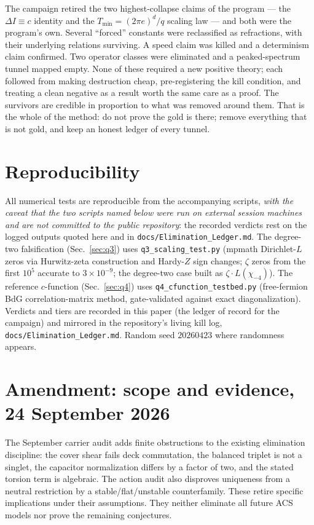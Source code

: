 \documentclass[11pt]{article}
\newcommand{\DI}{\Delta I}
\newcommand{\Tmin}{T_{\min}}
\begin{document}
The campaign retired the two highest-collapse claims of the program --- the
$\DI\equiv c$ identity and the $\Tmin=(2\pi e)^d/q$ scaling law --- and both were the
program's own. Several ``forced'' constants were reclassified as refractions, with their
underlying relations surviving. A speed claim was killed and a determinism claim
confirmed. Two operator classes were eliminated and a peaked-spectrum tunnel mapped
empty. None of these required a new positive theory; each followed from making
destruction cheap, pre-registering the kill condition, and treating a clean negative as a
result worth the same care as a proof. The survivors are credible in proportion to what
was removed around them. That is the whole of the method: do not prove the gold is there;
remove everything that is not gold, and keep an honest ledger of every tunnel.

\appendix
\section{Reproducibility}
All numerical tests are reproducible from the accompanying scripts, \emph{with the
caveat that the two scripts named below were run on external session machines and
are not committed to the public repository}: the recorded verdicts rest on the
logged outputs quoted here and in \nolinkurl{docs/Elimination_Ledger.md}. The degree-two
falsification (Sec.~\ref{sec:q3}) uses \texttt{q3\_scaling\_test.py} (mpmath
Dirichlet-$L$ zeros via Hurwitz-zeta construction and Hardy-$Z$ sign changes; $\zeta$
zeros from the first $10^5$ accurate to $3\times10^{-9}$; the degree-two case built as
$\zeta\cdot L(\chi_{-4})$). The reference $c$-function (Sec.~\ref{sec:q4}) uses
\texttt{q4\_cfunction\_testbed.py} (free-fermion BdG correlation-matrix method, gate-validated
against exact diagonalization). Verdicts and tiers are recorded in this paper (the ledger of record for
the campaign) and mirrored in the repository's living kill log,
\nolinkurl{docs/Elimination_Ledger.md}. Random seed $20260423$ where randomness appears.


\section*{Amendment: scope and evidence, 24 September 2026}
The September carrier audit adds finite obstructions to the existing elimination discipline: the cover shear fails deck commutation, the balanced triplet is not a singlet, the capacitor normalization differs by a factor of two, and the stated torsion term is algebraic. The action audit also disproves uniqueness from a neutral restriction by a stable/flat/unstable counterfamily. These retire specific implications under their assumptions. They neither eliminate all future ACS models nor prove the remaining conjectures.
\end{document}
